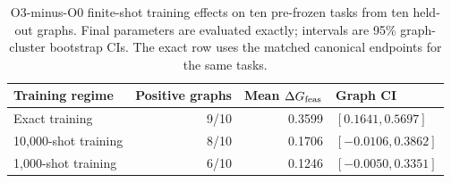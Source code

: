 \begin{table}[t]
\centering
\caption{O3-minus-O0 finite-shot training effects on ten pre-frozen tasks
from ten held-out graphs. Final parameters are evaluated exactly; intervals
are 95\% graph-cluster bootstrap CIs. The exact row uses the matched canonical
endpoints for the same tasks.}
\label{tab:reviewer-finite-training}
\small
\begin{tabular}{@{}lrrl@{}}
\toprule
Training regime & Positive graphs & Mean $\Delta G_{\mathrm{feas}}$ & Graph CI \\
\midrule
Exact training & 9/10 & 0.3599 & $[0.1641,0.5697]$ \\
10,000-shot training & 8/10 & 0.1706 & $[-0.0106,0.3862]$ \\
1,000-shot training & 6/10 & 0.1246 & $[-0.0050,0.3351]$ \\
\bottomrule
\end{tabular}
\end{table}
